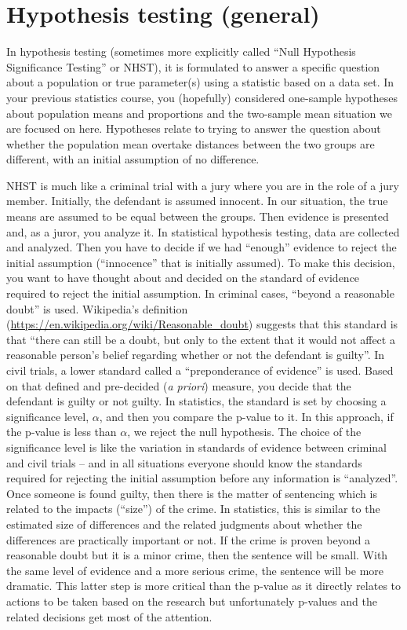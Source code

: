 \documentclass[
]{book}
\begin{document}
\newpage

\hypertarget{section2-5}{%
\section{Hypothesis testing (general)}\label{section2-5}}

In hypothesis testing
(sometimes more explicitly called ``Null Hypothesis
Significance Testing'' or NHST), it is formulated to answer a specific question about
a population or true parameter(s) using a statistic based on a data set.
In your previous statistics course, you (hopefully) considered one-sample
hypotheses about population means and proportions and the two-sample mean
situation we are focused on here. Hypotheses relate to trying to answer
the question about whether the population mean overtake distances between the two
groups are different, with an initial assumption of no difference.

\indent NHST is much like a criminal trial with a jury where you are in the role
of a jury member. Initially, the defendant
is assumed innocent. In our situation, the true means are assumed to be
equal between the groups. Then evidence is presented and, as a juror,
you analyze it. In statistical hypothesis testing,
data are collected and
analyzed. Then you have to decide if we had ``enough'' evidence to reject
the initial assumption (``innocence'' that is initially assumed). To make
this decision, you want to have thought about and decided on the standard of
evidence required to reject the initial assumption. In criminal cases,
``beyond a reasonable doubt'' is used. Wikipedia's definition
(\url{https://en.wikipedia.org/wiki/Reasonable_doubt}) suggests that this
standard is that ``there can still be a doubt, but only to the extent
that it would not affect a reasonable person's belief regarding whether
or not the defendant is guilty''. In civil trials, a lower standard called
a ``preponderance of evidence'' is used. Based on that defined and pre-decided
(\emph{a priori}) measure, you decide that the defendant is guilty or not guilty.
In statistics, the standard is set by choosing a significance level, \(\alpha\), and then you compare the p-value
to it. In this approach, if the p-value is less than
\(\alpha\), we reject the null hypothesis. The choice of the significance level
is like the variation in standards of evidence between criminal and civil
trials -- and in all situations everyone should know the standards required
for rejecting the initial assumption before any information is ``analyzed''.
Once someone is found guilty, then there is the matter of sentencing which
is related to the impacts (``size'') of the crime. In statistics, this is
similar to the estimated size of differences and the related judgments
about whether the differences are practically important or not. If the
crime is proven beyond a reasonable doubt but it is a minor crime, then
the sentence will be small. With the same level of evidence and a more
serious crime, the sentence will be more dramatic. This latter step is more critical than the p-value as it directly relates to actions to be taken based on the research but unfortunately p-values and the related decisions get most of the attention.
\end{document}
